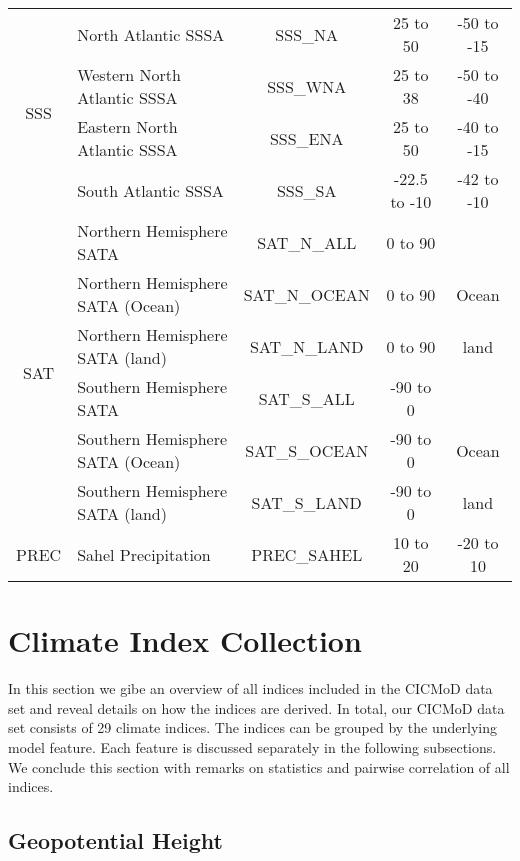 \documentclass{CUP-JNL-DTM}%
\theoremstyle{definition}
\numberwithin{equation}{section}
\begin{document}
\begin{table}
\begin{center}
\begin{tabular}{|c|l|c|cc|}
\hline
\multirow{4}{*}{SSS} & North Atlantic SSSA & SSS\_NA & 25 to 50 & -50 to -15\\
 & Western North Atlantic SSSA & SSS\_WNA & 25 to 38 & -50 to -40\\
 & Eastern North Atlantic SSSA & SSS\_ENA & 25 to 50 & -40 to -15\\
 & South Atlantic SSSA & SSS\_SA & -22.5 to -10 & -42 to -10\\
\hline
\multirow{6}{*}{SAT} & Northern Hemisphere SATA & SAT\_N\_ALL & 0 to 90 & \\
 & Northern Hemisphere SATA (Ocean) & SAT\_N\_OCEAN & 0 to 90 & Ocean \\
 & Northern Hemisphere SATA (land) & SAT\_N\_LAND & 0 to 90 & land \\
 & Southern Hemisphere SATA & SAT\_S\_ALL & -90 to 0 & \\
 & Southern Hemisphere SATA (Ocean) & SAT\_S\_OCEAN & -90 to 0 & Ocean\\
 & Southern Hemisphere SATA (land) & SAT\_S\_LAND & -90 to 0 & land\\
 \hline
\multirow{1}{*}{PREC} & Sahel Precipitation & PREC\_SAHEL & 10 to 20 & -20 to 10 \\
\hline
\end{tabular}
\end{center}
\end{table}

\section{Climate Index Collection \label{sec:Climate_Index_Collection}}

In this section we gibe an overview of all indices included in the CICMoD data set and reveal details on how the indices are derived. In total, our CICMoD data set consists of 29 climate indices. The indices can be grouped by the underlying model feature. Each feature is discussed separately in the following subsections. We conclude this section with remarks on statistics and pairwise correlation of all indices.

\subsection{Geopotential Height \label{subsec:Z500}}
\end{document}
